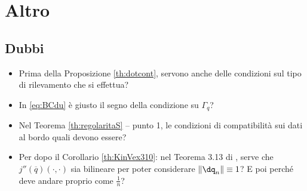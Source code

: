 \section{Altro}
\subsection{Dubbi}
\begin{itemize}
\item
	Prima della Proposizione \ref{th:dotcont}, servono anche delle condizioni sul tipo di rilevamento che si effettua?
\item
	In \eqref{eq:BCdu} è giusto il segno della condizione su $\Gamma_q$?
\item
	Nel Teorema \ref{th:regolaritaS} -- punto 1, le condizioni di compatibilità sui dati al bordo quali devono essere?
\item
	Per dopo il Corollario \ref{th:KinVex310}: nel Teorema 3.13 di \cite{Kinigera}, serve che $j''(\overline{q})(\cdot,\cdot)$ sia bilineare per poter considerare $\|\dq_n\|\equiv1$? E poi perché deve andare proprio come $\frac{1}{n}$?
\end{itemize}
